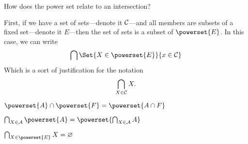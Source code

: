 

How does the power set relate to an intersection?


First, if we have a set of sets---denote it $\mathcal{C}$---and all members are subsets of a fixed set---denote it $E$---then the set of sets is a subset of $\powerset{E}$.
In this case, we can write
\[
  \bigcap \Set{X \in \powerset{E}}{x \in \CC}
\]
Which is a sort of justification for the notation
\[
  \bigcap_{X \in \mathcal{C}} X.
\]


\begin{proposition}
  $\powerset{A} \cap \powerset{F} = \powerset{A \cap F}$
\end{proposition}

\begin{proposition}
  $\bigcap_{X \in \CA} \powerset{A} = \powerset{\bigcap_{X \in \CA} A}$
\end{proposition}

\begin{proposition}
  $\bigcap_{X \in \powerset{E}} X = \emptyset$
\end{proposition}


\blankpage
